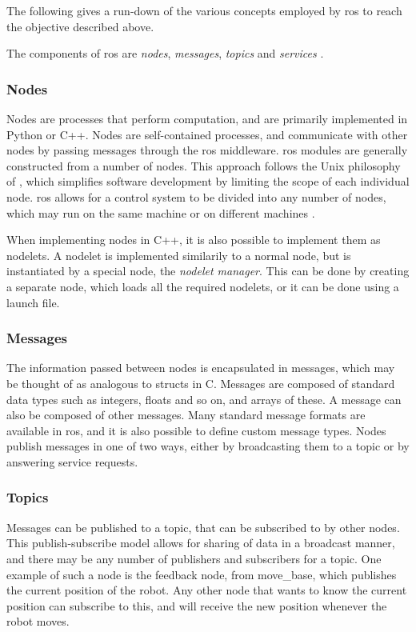 \documentclass[\rootfolder/main.tex]{subfiles}
\begin{document}
The following gives a run-down of the various concepts employed by \acrshort{ros} to reach the objective described above.

The components of \acrshort{ros} are \emph{nodes}, \emph{messages}, \emph{topics} and \emph{services} \cite{Quigley2009}.

\subsubsection{Nodes}

Nodes are processes that perform computation, and are primarily implemented in Python or C++.
Nodes are self-contained processes, and communicate with other nodes by passing messages through the \acrshort{ros} middleware.
\acrshort{ros} modules are generally constructed from a number of nodes.
This approach follows the Unix philosophy of , which simplifies software development by limiting the scope of each individual node.
\acrshort{ros} allows for a control system to be divided into any number of nodes, which may run on the same machine or on different machines \cite{ROS}.

When implementing nodes in C++, it is also possible to implement them as nodelets.
A nodelet is implemented similarily to a normal node, but is instantiated by a special node, the \emph{nodelet manager}.
This can be done by creating a separate node, which loads all the required nodelets, or it can be done using a launch file.

\subsubsection{Messages}

The information passed between nodes is encapsulated in messages, which may be thought of as analogous to structs in C.
Messages are composed of standard data types such as integers, floats and so on, and arrays of these.
A message can also be composed of other messages.
Many standard message formats are available in \acrshort{ros}, and it is also possible to define custom message types.
Nodes publish messages in one of two ways, either by broadcasting them to a topic or by answering service requests.

\subsubsection{Topics}

Messages can be published to a topic, that can be subscribed to by other nodes.
This publish-subscribe model allows for sharing of data in a broadcast manner, and there may be any number of publishers and subscribers for a topic.
One example of such a node is the feedback node, from move\_base, which publishes the current position of the robot.
Any other node that wants to know the current position can subscribe to this, and will receive the new position whenever the robot moves.
\end{document}
